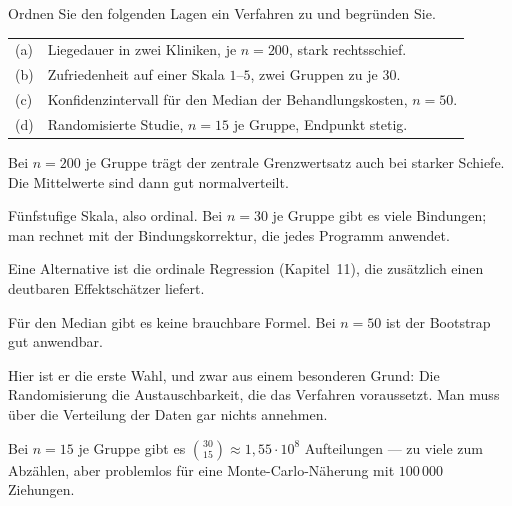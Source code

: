 \begin{aufgabe}
Ordnen Sie den folgenden Lagen ein Verfahren zu und begründen Sie.
\begin{center}
{\small
\renewcommand{\arraystretch}{1.4}
\begin{tabular}{@{}P{0.8cm}P{7.6cm}@{}}
\toprule
(a) & Liegedauer in zwei Kliniken, je $n=200$, stark rechtsschief.\\
(b) & Zufriedenheit auf einer Skala $1$--$5$, zwei Gruppen zu je $30$.\\
(c) & Konfidenzintervall für den Median der Behandlungskosten, $n=50$.\\
(d) & Randomisierte Studie, $n=15$ je Gruppe, Endpunkt stetig.\\
\bottomrule
\end{tabular}}
\end{center}

\loesung
{}
Bei $n = 200$ je Gruppe trägt der zentrale Grenzwertsatz auch bei starker Schiefe. Die Mittelwerte sind dann gut normalverteilt.

\begin{center}
\begin{minipage}{0.86\textwidth}
\end{minipage}
\end{center}

Fünfstufige Skala, also ordinal. Bei $n = 30$ je Gruppe gibt es viele Bindungen; man rechnet mit der Bindungskorrektur, die jedes Programm anwendet.

Eine Alternative ist die ordinale Regression (Kapitel~11), die zusätzlich einen deutbaren Effektschätzer liefert.

Für den Median gibt es keine brauchbare Formel. Bei $n = 50$ ist der Bootstrap gut anwendbar.

Hier ist er die erste Wahl, und zwar aus einem besonderen Grund: Die Randomisierung  die Austauschbarkeit, die das Verfahren voraussetzt. Man muss über die Verteilung der Daten gar nichts annehmen.

Bei $n=15$ je Gruppe gibt es $\binom{30}{15} \approx 1{,}55 \cdot 10^8$ Aufteilungen --- zu viele zum Abzählen, aber problemlos für eine Monte-Carlo-Näherung mit $100\,000$ Ziehungen.


\end{aufgabe}
